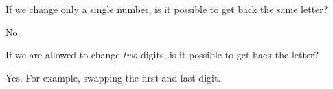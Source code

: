 \documentclass[a4paper,12pt]{article}
\begin{document}
\begin{question}[skip-below=3\baselineskip]
If we change only a single number, is it possible to get back the same letter?
\end{question}

\begin{solution}
No.
\end{solution}

\begin{question}[skip-below=3\baselineskip]
If we are allowed to change \emph{two} digits, is it possible to get back the letter?
\end{question}

\begin{solution}
Yes. For example, swapping the first and last digit.
\end{solution}
\end{document}
